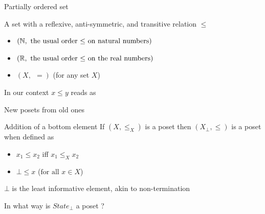 \documentclass{beamer}
\begin{document}
\begin{frame}{Partially ordered set}

        \begin{definition}[Poset]
                A set with a reflexive, anti-symmetric, and transitive
                relation $\leq$
        \end{definition}

        \begin{examples}
                \begin{itemize}
                        \item $(\mathbb{N}, \text{ the usual order $\leq$ on natural numbers})$
                        \item $(\mathbb{R}, \text{ the usual order $\leq$ on the real numbers})$
                        \item $(X, \> \> =)$ \small{(for any set $X$)}
                \end{itemize}
        \end{examples}

        \pause
        \vfill
        In our context $x \leq y$ reads as
        \begin{center}
        \end{center}
\end{frame}

\begin{frame}{New posets from old ones}

        \begin{block}{Addition of a bottom element}
                If $(X, \leq_X)$ is a poset then $(X_\bot, \leq)$ is
                a poset when defined as
                \begin{itemize}
                        \item $x_1 \leq x_2$  iff $x_1 \leq_X x_2$
                        \item $\bot \leq x$ ($\text{for all } x \in X$)
                \end{itemize}
        \end{block}

        $\bot$ is the least informative element, akin to non-termination

        \pause
        \medskip
        \begin{example}
                In what way is $State_\bot$ a poset ?
        \end{example}
\end{frame}
\end{document}
